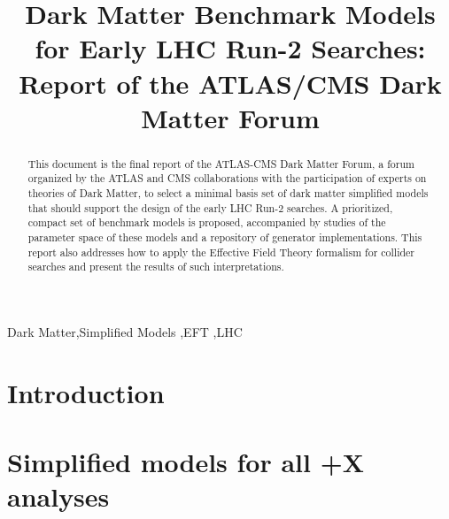 \documentclass[review]{elsarticle}
\begin{document}
\begin{frontmatter}

\title{Dark Matter Benchmark Models for Early LHC Run-2 Searches: Report of the ATLAS/CMS Dark Matter Forum}






\begin{abstract}
This document is the final report of the ATLAS-CMS Dark Matter Forum, a forum organized by the ATLAS and CMS collaborations with the participation of experts on theories of Dark Matter, to select a minimal basis set of dark matter simplified models that should support the design of the early LHC Run-2 searches. A prioritized, compact set of benchmark models is proposed, accompanied by studies of the parameter space of these models and a repository of generator implementations. This report also addresses how to apply the Effective Field Theory formalism for collider searches and present the results of such interpretations.
\end{abstract}

\begin{keyword}
	Dark Matter\sep Simplified Models \sep EFT \sep LHC
\end{keyword}

\end{frontmatter}



\linenumbers

\section{Introduction}
\label{sec:Introduction}


\section{\texorpdfstring{Simplified models for all \MET+X analyses}{Simplified models for all MET+X analyses}}
\label{subsec:MonojetLikeModels}

\end{document}
